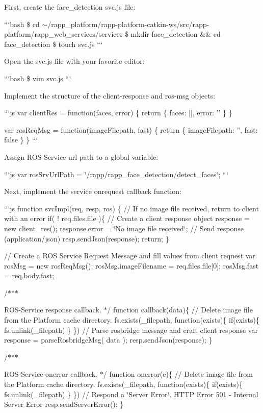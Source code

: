 First, create the face\-\_\-detection {\ttfamily svc.\-js} file\-:

```bash \$ cd $\sim$/rapp\-\_\-platform/rapp-\/platform-\/catkin-\/ws/src/rapp-\/platform/rapp\-\_\-web\-\_\-services/services \$ mkdir face\-\_\-detection \&\& cd face\-\_\-detection \$ touch svc.\-js ```

Open the svc.\-js file with your favorite editor\-:

```bash \$ vim svc.\-js ```

Implement the structure of the {\ttfamily client-\/response} and {\ttfamily ros-\/msg} objects\-:

```js var client\-Res = function(faces, error) \{ return \{ faces\-: \mbox{[}\mbox{]}, error\-: '' \} \}

var ros\-Req\-Msg = function(image\-Filepath, fast) \{ return \{ image\-Filepath\-: '', fast\-: false \} \} ```

Assign R\-O\-S Service url path to a global variable\-:

```js var ros\-Srv\-Url\-Path = \char`\"{}/rapp/rapp\-\_\-face\-\_\-detection/detect\-\_\-faces\char`\"{}; ```

Next, implement the service onrequest callback function\-:

```js function svc\-Impl(req, resp, ros) \{ // If no image file received, return to client with an error if( ! req.\-files.\-file )\{ // Create a client response object response = new client\-\_\-res(); response.\-error = \char`\"{}\-No image file received\char`\"{}; // Send response (application/json) resp.\-send\-Json(response); return; \}

// Create a R\-O\-S Service Request Message and fill values from client request var ros\-Msg = new ros\-Req\-Msg(); ros\-Msg.\-image\-Filename = req.\-files.\-file\mbox{[}0\mbox{]}; ros\-Msg.\-fast = req.\-body.\-fast;

/$\ast$$\ast$$\ast$
\begin{DoxyItemize}
\item R\-O\-S-\/\-Service response callback. $\ast$/ function callback(data)\{ // Delete image file from the Platform cache directory. fs.\-exists(\-\_\-filepath, function(exists)\{ if(exists)\{ fs.\-unlink(\-\_\-filepath) \} \}) // Parse rosbridge message and craft client response var response = parse\-Rosbridge\-Msg( data ); resp.\-send\-Json(response); \}
\end{DoxyItemize}

/$\ast$$\ast$$\ast$
\begin{DoxyItemize}
\item R\-O\-S-\/\-Service onerror callback. $\ast$/ function onerror(e)\{ // Delete image file from the Platform cache directory. fs.\-exists(\-\_\-filepath, function(exists)\{ if(exists)\{ fs.\-unlink(\-\_\-filepath) \} \}) // Respond a \char`\"{}\-Server Error\char`\"{}. H\-T\-T\-P Error 501 -\/ Internal Server Error resp.\-send\-Server\-Error(); \}
\end{DoxyItemize}

